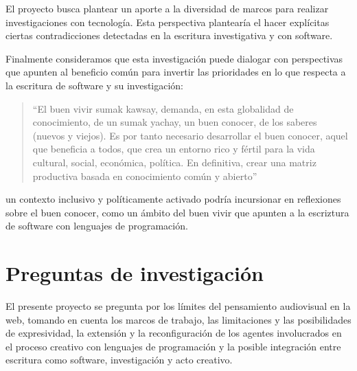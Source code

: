 El proyecto busca plantear un aporte a la diversidad de marcos para realizar investigaciones con tecnología. Esta perspectiva plantearía el hacer explícitas ciertas contradicciones detectadas en la escritura investigativa y con software. 

Finalmente consideramos que esta investigación puede dialogar con perspectivas que apunten al beneficio común para invertir las prioridades en lo que respecta a la escritura de software y su investigación:

\begin{quote}

  ``El buen vivir sumak kawsay, demanda, en esta globalidad de conocimiento, de un sumak yachay, un buen conocer, de los saberes (nuevos y viejos). Es por tanto necesario desarrollar el buen conocer, aquel que beneficia a todos, que crea un entorno rico y fértil para la vida cultural, social, económica, política. En definitiva, crear una matriz productiva basada en conocimiento común y abierto''\citep[p.~31]{platohedro}

\end{quote}

un contexto inclusivo y políticamente activado podría incursionar en reflexiones sobre el buen conocer, como un ámbito del buen vivir que apunten a la escriztura de software con lenguajes de programación.  


\section{Preguntas de investigación} %





El presente proyecto se pregunta por los límites del pensamiento audiovisual en la web, tomando en cuenta los marcos de trabajo, las limitaciones y las posibilidades de expresividad, la extensión y la reconfiguración de los agentes involucrados en el proceso creativo con lenguajes de programación y la posible integración entre escritura como software, investigación y acto creativo.

